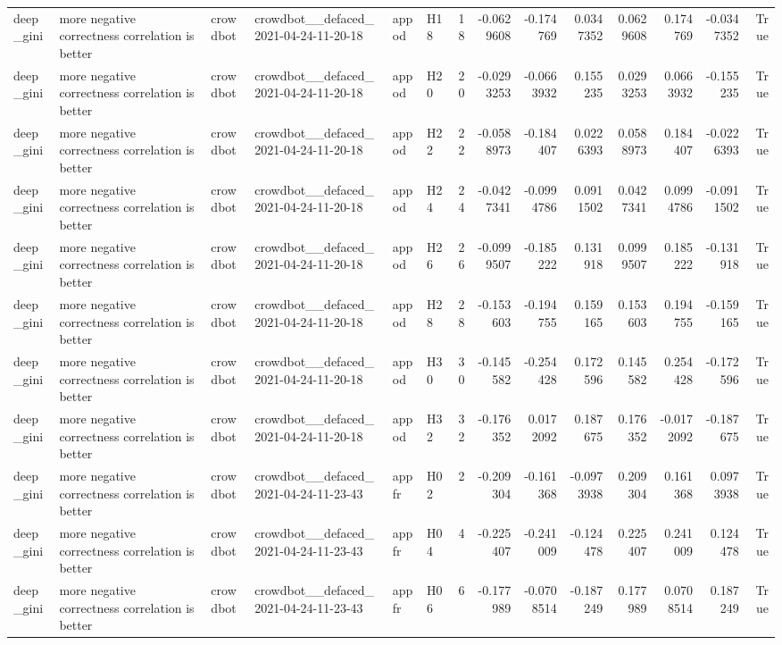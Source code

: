 \begin{longtable}{llllllrrrrrrrr}
deep\_gini & more negative correctness correlation is better & crowdbot & crowdbot\_\_defaced\_2021-04-24-11-20-18 & appod & H18 & 18 & -0.0629608 & -0.174769 & 0.0347352 & 0.0629608 & 0.174769 & -0.0347352 & True \\
deep\_gini & more negative correctness correlation is better & crowdbot & crowdbot\_\_defaced\_2021-04-24-11-20-18 & appod & H20 & 20 & -0.0293253 & -0.0663932 & 0.155235 & 0.0293253 & 0.0663932 & -0.155235 & True \\
deep\_gini & more negative correctness correlation is better & crowdbot & crowdbot\_\_defaced\_2021-04-24-11-20-18 & appod & H22 & 22 & -0.0588973 & -0.184407 & 0.0226393 & 0.0588973 & 0.184407 & -0.0226393 & True \\
deep\_gini & more negative correctness correlation is better & crowdbot & crowdbot\_\_defaced\_2021-04-24-11-20-18 & appod & H24 & 24 & -0.0427341 & -0.0994786 & 0.0911502 & 0.0427341 & 0.0994786 & -0.0911502 & True \\
deep\_gini & more negative correctness correlation is better & crowdbot & crowdbot\_\_defaced\_2021-04-24-11-20-18 & appod & H26 & 26 & -0.0999507 & -0.185222 & 0.131918 & 0.0999507 & 0.185222 & -0.131918 & True \\
deep\_gini & more negative correctness correlation is better & crowdbot & crowdbot\_\_defaced\_2021-04-24-11-20-18 & appod & H28 & 28 & -0.153603 & -0.194755 & 0.159165 & 0.153603 & 0.194755 & -0.159165 & True \\
deep\_gini & more negative correctness correlation is better & crowdbot & crowdbot\_\_defaced\_2021-04-24-11-20-18 & appod & H30 & 30 & -0.145582 & -0.254428 & 0.172596 & 0.145582 & 0.254428 & -0.172596 & True \\
deep\_gini & more negative correctness correlation is better & crowdbot & crowdbot\_\_defaced\_2021-04-24-11-20-18 & appod & H32 & 32 & -0.176352 & 0.0172092 & 0.187675 & 0.176352 & -0.0172092 & -0.187675 & True \\
deep\_gini & more negative correctness correlation is better & crowdbot & crowdbot\_\_defaced\_2021-04-24-11-23-43 & appfr & H02 & 2 & -0.209304 & -0.161368 & -0.0973938 & 0.209304 & 0.161368 & 0.0973938 & True \\
deep\_gini & more negative correctness correlation is better & crowdbot & crowdbot\_\_defaced\_2021-04-24-11-23-43 & appfr & H04 & 4 & -0.225407 & -0.241009 & -0.124478 & 0.225407 & 0.241009 & 0.124478 & True \\
deep\_gini & more negative correctness correlation is better & crowdbot & crowdbot\_\_defaced\_2021-04-24-11-23-43 & appfr & H06 & 6 & -0.177989 & -0.0708514 & -0.187249 & 0.177989 & 0.0708514 & 0.187249 & True \\

\end{longtable}
